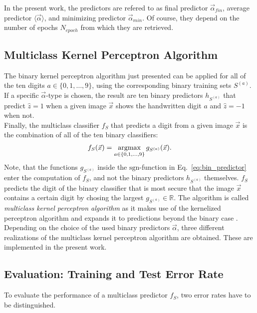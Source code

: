 In the present work, the predictors are refered to as final predictor $\vec{\alpha}_{fin}$, average predictor $\langle \vec{\alpha} \rangle$, and minimizing predictor $\vec{\alpha}_{min}$. Of course, they depend on the number of epochs $N_{epoch}$ from which they are retrieved.

\subsection{Multiclass Kernel Perceptron Algorithm}

The binary kernel perceptron algorithm just presented can be applied for all of the ten digits $a \in \{0, 1, \dots, 9\}$, using the corresponding binary training sets $S^{(a)}$. If a specific $\vec{\alpha}$-type is chosen, the result are ten binary predictors $h_{S^{(a)}}$ that predict $\hat{z} = 1$ when a given image $\vec{x}$ shows the handwritten digit $a$ and $\hat{z} = -1$ when not. \\

Finally, the multiclass classifier $f_S$ that predicts a digit from a given image $\vec{x}$ is the combination of all of the ten binary classifiers:
\begin{align*}
	f_S(\vec{x}) = \operatorname*{argmax}_{a \in \{0, 1, \dots, 9\}} g_{S^{(a)}}(\vec{x}).
\end{align*}
Note, that the functions $g_{S^{(a)}}$ inside the $\mathrm{sgn}$-function in Eq.~\ref{eq:bin_predictor} enter the computation of $f_S$, and not the binary predictors $h_{S^{(a)}}$ themselves.
$f_S$ predicts the digit of the binary classifier that is most secure that the image $\vec{x}$ contains a certain digit by chosing the largest $g_{S^{(a)}}\in\mathbb{R}$. The algorithm is called \textit{multiclass kernel perceptron algorithm} as it makes use of the kernelized perceptron algorithm and expands it to predictions beyond the binary case \cite{multiclass2005}. Depending on the choice of the used binary predictors $\vec{\alpha}$, three different realizations of the multiclass kernel perceptron algorithm are obtained. These are implemented in the present work.

\subsection{Evaluation: Training and Test Error Rate}

To evaluate the performance of a multiclass predictor $f_S$, two error rates have to be distinguished. 

